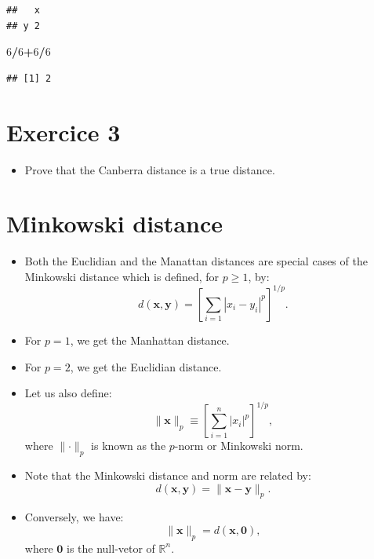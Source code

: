 \documentclass[
]{article}
\newenvironment{Shaded}{\begin{snugshade}}{\end{snugshade}}
\newcommand{\DecValTok}[1]{\textcolor[rgb]{0.00,0.00,0.81}{#1}}
\newcommand{\OperatorTok}[1]{\textcolor[rgb]{0.81,0.36,0.00}{\textbf{#1}}}
\providecommand{\tightlist}{%
  \setlength{\itemsep}{0pt}\setlength{\parskip}{0pt}}
\begin{document}
\begin{verbatim}
##   x
## y 2
\end{verbatim}

\begin{Shaded}
\begin{Highlighting}[]
\DecValTok{6}\OperatorTok{/}\DecValTok{6}\OperatorTok{+}\DecValTok{6}\OperatorTok{/}\DecValTok{6}
\end{Highlighting}
\end{Shaded}

\begin{verbatim}
## [1] 2
\end{verbatim}

\hypertarget{exercice-3}{%
\section{Exercice 3}\label{exercice-3}}

\begin{itemize}
\tightlist
\item
  Prove that the Canberra distance is a true distance.
\end{itemize}

\hypertarget{minkowski-distance}{%
\section{Minkowski distance}\label{minkowski-distance}}

\begin{itemize}
\tightlist
\item
  Both the Euclidian and the Manattan distances are special cases of the
  Minkowski distance which is defined, for \(p\geq 1\), by: \[
  d(\mathbf{x},\mathbf{y})=
  \left[\sum_{i=1} |x_i-y_i|^{p}\right]^{1/p}.
  \]
\item
  For \(p=1\), we get the Manhattan distance.
\item
  For \(p=2\), we get the Euclidian distance.
\item
  Let us also define:
  \[\|\mathbf{x}\|_p\equiv\left[\sum_{i=1}^n |x_i|^{p}\right]^{1/p},\]
  where \(\|\mathbf{\cdot}\|_p\) is known as the \(p\)-norm or Minkowski
  norm.
\item
  Note that the Minkowski distance and norm are related by: \[
  d(\mathbf{x},\mathbf{y})=\|\mathbf{x}-\mathbf{y}\|_p.
  \]
\item
  Conversely, we have: \[
  \|\mathbf{x}\|_p=d(\mathbf{x},\mathbf{0}),
  \] where \(\mathbf{0}\) is the null-vetor of \(\mathbb{R}^n\).
\end{itemize}
\end{document}
